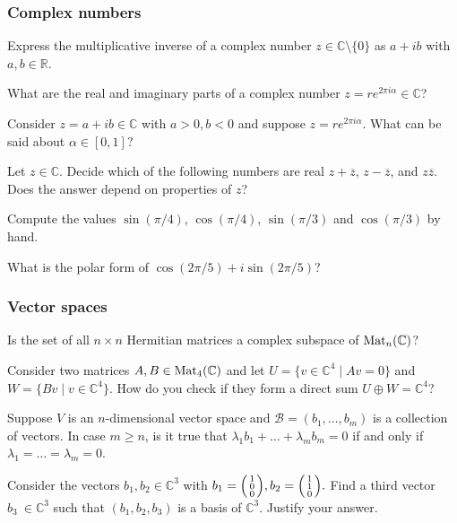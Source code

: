 \documentclass[a4paper, oneside, 12pt]{amsart}
\begin{document}
\subsubsection*{Complex numbers}
\begin{thmlist}
  \item Express the multiplicative inverse of a complex number \(z \in \mathbb{C}\setminus\{0\}\) as  \(a + ib\) with \(a, b \in \mathbb{R}\).
  \item What are the real and imaginary parts of a complex number \(z = re^{2\pi i \alpha} \in \mathbb{C}\)?
  \item Consider \(z=a+ib \in \mathbb{C}\) with \(a>0, b<0\) and suppose \(z = re^{2\pi i \alpha}\).
  What can be said about \(\alpha \in [0,1]\)?
  \item Let \(z\in \mathbb{C} \).
  Decide which of the following numbers are real \(z + \overline{z}\), \(z - \overline{z}\), and \(z\overline{z}\).
  Does the answer depend on properties of \(z\)?
  \item Compute the values \(\sin(\pi/4)\), \(\cos(\pi/4)\), \(\sin(\pi/3)\) and \(\cos(\pi/3)\) by hand.
  \item What is the polar form of \(\cos(2\pi /5)+ i \sin(2\pi /5)\)?
\end{thmlist}

\subsubsection*{Vector spaces}
\begin{thmlist}
  \item Is the set of all \(n \times n\) Hermitian matrices a complex subspace of \(\operatorname{Mat}_n(\mathbb{C})\)?
  \item Consider two matrices \(A, B \in \operatorname{Mat}_{4}( \mathbb{C})\) and let \(U =\{v \in \mathbb{C}^{4} \mid Av = 0\}\) and \(W =\{Bv \mid v \in \mathbb{C}^{4}\}\).
  How do you check if they form a direct sum \(U \oplus W = \mathbb{C}^4\)?
  \item Suppose \(V\) is an \(n\)-dimensional vector space and \(\mathcal{B}=(b_{1}, \dots , b_{m})\) is a collection of vectors.
  In case \(m\geq n\), is it true that \(\lambda_{1}b_{1} + \dots + \lambda_{m} b_{m} = 0\)  if and only if \(\lambda_{1} = \dots = \lambda_{m} = 0 \).
  \item Consider the vectors \(b_{1}, b_{2} \in \mathbb{C}^{3}\) with \(
  b_{1} = \begin{psmallmatrix}
    1 \\ 0 \\ 0
  \end{psmallmatrix},
  b_{2} = \begin{psmallmatrix}
    1 \\ 1 \\ 0
  \end{psmallmatrix}.
  \)
  Find a third vector \(b_{3}\ \in \mathbb{C}^{3}\) such that \((b_{1}, b_{2}, b_{3})\) is a basis of \( \mathbb{C}^{3}\). Justify your answer.
\end{thmlist}
\end{document}

